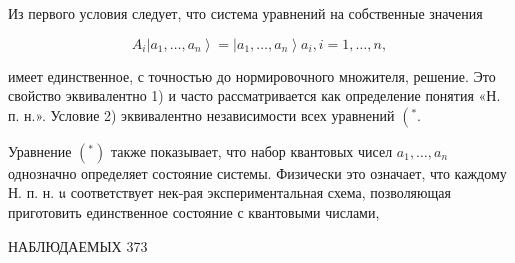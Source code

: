\documentclass[10pt]{article}
\begin{document}
Из первого условия следует, что система уравнений на собственные значения



\[

A_{i}\left|a_{1}, \ldots, a_{n}\right\rangle=\left|a_{1}, \ldots, a_{n}\right\rangle a_{i}, i=1, \ldots, n,

\]



имеет единственное, с точностью до нормировочного множителя, решение. Это свойство эквивалентно 1) и часто рассматривается как определение понятия «Н. п. н.». Условие 2) эквивалентно независимости всех уравнений $\left({ }^{*}\right.$.



Уравнение $\left({ }^{*}\right)$ также показывает, что набор квантовых чисел $a_{1}, \ldots, a_{n}$ однозначно определяет состояние системы. Физически это означает, что каждому Н. п. н. $\mathfrak{u}$ соответствует нек-рая экспериментальная схема, позволяющая приготовить единственное состояние с квантовыми числами,



НАБЛЮДАЕМЫХ 373
\end{document}
